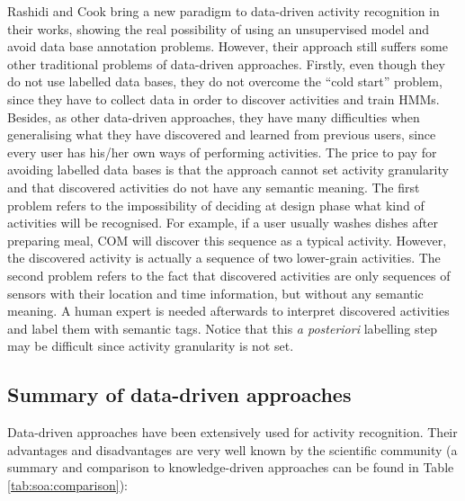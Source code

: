 Rashidi and Cook bring a new paradigm to data-driven activity recognition in their works, showing the real possibility of using an unsupervised model and avoid data base annotation problems. However, their approach still suffers some other traditional problems of data-driven approaches. Firstly, even though they do not use labelled data bases, they do not overcome the ``cold start'' problem, since they have to collect data in order to discover activities and train HMMs. Besides, as other data-driven approaches, they have many difficulties when generalising what they have discovered and learned from previous users, since every user has his/her own ways of performing activities. The price to pay for avoiding labelled data bases is that the approach cannot set activity granularity and that discovered activities do not have any semantic meaning. The first problem refers to the impossibility of deciding at design phase what kind of activities will be recognised. For example, if a user usually washes dishes after preparing meal, COM will discover this sequence as a typical activity. However, the discovered activity is actually a sequence of two lower-grain activities. The second problem refers to the fact that discovered activities are only sequences of sensors with their location and time information, but without any semantic meaning. A human expert is needed afterwards to interpret discovered activities and label them with semantic tags. Notice that this \textit{a posteriori} labelling step may be difficult since activity granularity is not set. 


\subsection{Summary of data-driven approaches}

Data-driven approaches have been extensively used for activity recognition. Their advantages and disadvantages are very well known by the scientific community (a summary and comparison to knowledge-driven approaches can be found in Table \ref{tab:soa:comparison}):

